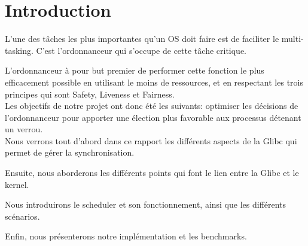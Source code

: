 \section*{Introduction}
L'une des tâches les plus importantes qu'un OS doit faire est de faciliter le
multi-tasking.
C'est l'ordonnanceur qui s'occupe de cette tâche critique.

L'ordonnanceur à pour but premier de performer cette fonction le plus
efficacement possible en utilisant le moins de ressources, et en respectant les
trois principes qui sont Safety, Liveness et Fairness.
\\

Les objectifs de notre projet ont donc été les suivants: optimiser les
décisions de l'ordonnanceur pour apporter une élection plus favorable aux
processus détenant un verrou.
\\

Nous verrons tout d'abord dans ce rapport les différents aspects de la Glibc
qui permet de gérer la synchronisation. 

Ensuite, nous aborderons les différents points qui font le lien entre la Glibc
et le kernel. 

Nous introduirons le scheduler et son fonctionnement, ainsi que les différents
scénarios.

Enfin, nous présenterons notre implémentation et les benchmarks.